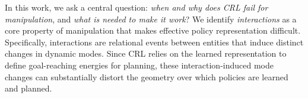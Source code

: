 
In this work, we ask a central question: \textit{when and why does CRL fail for manipulation}, and \textit{what is needed to make it work}? We identify \textit{interactions} as a core property of manipulation that makes effective policy representation difficult. Specifically, interactions are relational events between entities that induce distinct changes in dynamic modes. Since CRL relies on the learned representation to define goal-reaching energies for planning, these interaction-induced mode changes can substantially distort the geometry over which policies are learned and planned.

